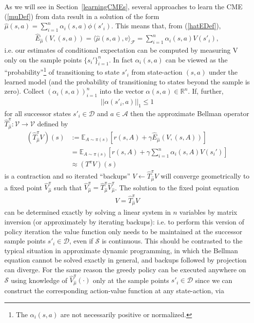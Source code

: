 \documentclass[letterpaper]{article}
\newcommand{\cD}{{\mathcal D}}
\newcommand{\cF}{{\mathcal F}}
\newcommand{\cA}{{\mathcal A}}
\newcommand{\cS}{{\mathcal S}}
\newcommand{\cV}{{\mathcal V}}
\newcommand{\E}{{\mathbb E}}
\newcommand{\R}{{\mathbb R}}
\newcommand{\lang}{\langle}
\newcommand{\rang}{\rangle}
\newcommand{\nn}{\nonumber}
\begin{document}
As we will see in Section~\ref{learningCMEs}, several approaches to learn the CME (\ref{muDef}) from data result in a solution of the form $\hat \mu(s,a) = \sum_{i=1}^n \alpha_i(s,a) \phi(s'_i)$. This means that, from (\ref{hatEDef}),
\begin{align}
\hat E_{\hat\mu}(V,(s,a)) = \lang \hat \mu(s,a) , v \rang_\cF =\sum_{i=1}^n \alpha_i(s,a) V(s'_i), \label{finiteExpansion}
\end{align}
i.e. our estimates of conditional expectation can be computed by measuring V only on the sample points $\{ s_i'\}_{i=1}^n$. In fact $\alpha_i(s,a)$ can be viewed as the ``probability''\footnote{The $\alpha_i(s,a)$ are not necessarily positive or normalized.} of transitioning to state $s'_i$ from state-action $(s,a)$ under the learned model (and the probability of transitioning to states beyond the sample is zero). Collect $(\alpha_i(s,a))_{i=1}^n$ into the vector $\alpha(s,a)\in \R^n$.
If, further,
\begin{align}
||\alpha(s'_i,a)||_1 \le 1 \label{L1Constraint}
\end{align}
for all successor states $s'_i\in\cD$ and $a\in\cA$ then the approximate Bellman operator $\hat T^\pi_{\hat \mu}:\cV\to\cV$ defined by
\begin{align}
(\hat T^\pi_{\hat \mu}V)(s)&:=  \E_{A\sim\pi(s)} [ r(s,A) + \gamma \hat E_{\hat \mu}(V, (s,A))] \nn\\
&= \E_{A\sim\pi(s)} [ r(s,A) + \gamma \sum_{i=1}^n \alpha_i(s,A)V(s_i') ] \label{approxBellman}\\
&\approx (T^\pi V)(s)\nn
\end{align}
is a contraction and so iterated ``backups'' $V\leftarrow \hat T^\pi_{\hat \mu}V$ will converge geometrically to a fixed point $\hat V_{\hat \mu}^{\pi}$ such that $\hat V_{\hat \mu}^{\pi} = \hat T^\pi_{\hat \mu} \hat V_{\hat \mu}^{\pi}$. The solution to the fixed point equation
\begin{align}
V =  \hat T^\pi_{\hat \mu} V \label{approxFP}
\end{align}
can be determined exactly by solving a linear system in $n$ variables by matrix inversion (or approximately by iterating backups): i.e. to perform this version of policy iteration the value function only needs to be maintained at the successor sample points $s'_i\in\cD$, even if $\cS$ is continuous. This should be contrasted to the typical situation in approximate dynamic programming, in which the Bellman equation cannot be solved exactly in general, and backups followed by projection can diverge. For the same reason the greedy policy can be executed anywhere on $\cS$ using knowledge of $\hat V_{\hat \mu}^{\pi}(\cdot)$ only at the sample points $s'_i\in\cD$ since we can construct the corresponding action-value function at any state-action, via
\end{document}
